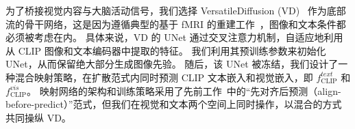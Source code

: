 为了桥接视觉内容与大脑活动信号，我们选择 VersatileDiffusion (VD)~\cite{xu2023versatile} 作为底部流的骨干网络，这是因为遵循典型的基于 fMRI 的重建工作~\cite{ozcelik2023brain,scotti2023reconstructing}，图像和文本条件都必须被考虑在内。
具体来说，VD 的 UNet 通过交叉注意力机制，自适应地利用从 CLIP 图像和文本编码器中提取的特征。
我们利用其预训练参数来初始化 UNet，从而保留绝大部分生成图像先验。
随后，该 UNet 被冻结，我们设计了一种混合映射策略，在扩散范式内同时预测 CLIP 文本嵌入和视觉嵌入，即 $f_{\text{CLIP}}^{text}$ 和 $f_{\text{CLIP}}^{vis}$。
映射网络的架构和训练策略采用了先前工作~\cite{ramesh2022hierarchical,scotti2023reconstructing}中的“先对齐后预测（align-before-predict）”范式，但我们在视觉和文本两个空间上同时操作，以混合的方式共同操纵 VD。

